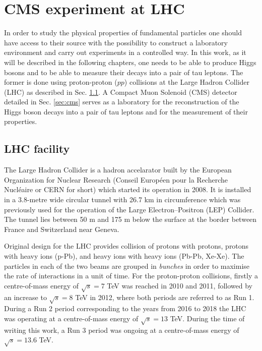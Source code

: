 \chapter{CMS experiment at LHC}\label{sec:cms-exp}

In order to study the physical properties of fundamental particles one should have access to their source with the possibility to construct a laboratory environment and carry out experiments in a controlled way. In this work, as it will be described in the following chapters, one needs to be able to produce Higgs bosons and to be able to measure their decays into a pair of tau leptons. The former is done using proton-proton ($pp$) collisions at the Large Hadron Collider (LHC) as described in Sec. \ref{sec:lhc}. A Compact Muon Solenoid (CMS) detector detailed in Sec. \ref{sec:cms} serves as a laboratory for the reconstruction of the Higgs boson decays into a pair of tau leptons and for the measurement of their properties.

\section{LHC facility}\label{sec:lhc}

The Large Hadron Collider \cite{Evans:2008zzb} is a hadron accelarator built by the European Organization for Nuclear Research (Conseil Européen pour la Recherche Nucléaire or CERN for short) which started its operation in 2008. It is installed in a 3.8-metre wide circular tunnel with 26.7 km in circumference which was previously used for the operation of the Large Electron–Positron (LEP) Collider. The tunnel lies between 50 m and 175 m below the surface at the border between France and Switzerland near Geneva.

Original design for the LHC provides collision of protons with protons, protons with heavy ions (p-Pb), and heavy ions with heavy ions (Pb-Pb, Xe-Xe). The particles in each of the two beams are grouped in \textit{bunches} in order to maximise the rate of interactions in a unit of time. For the proton-proton collisions, firstly a centre-of-mass energy of $\sqrt{s} = 7$ TeV was reached in 2010 and 2011, followed by an increase to $\sqrt{s} = 8$ TeV in 2012, where both periods are referred to as Run 1. During a Run 2 period corresponding to the years from 2016 to 2018 the LHC was operating at a centre-of-mass energy of $\sqrt{s} = 13$ TeV. During the time of writing this work, a Run 3 period was ongoing at a centre-of-mass energy of $\sqrt{s} = 13.6$ TeV. 

